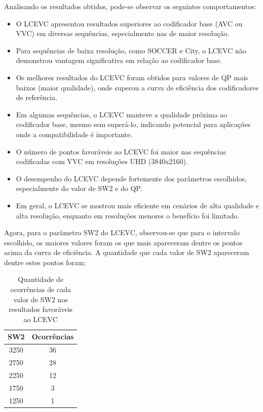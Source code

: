 Analisando os resultados obtidos, pode-se observar os seguintes comportamentos:

\begin{itemize}
    \item O LCEVC apresentou resultados superiores ao codificador base (AVC ou VVC) em diversas sequências, especialmente nas de maior resolução.
    \item Para sequências de baixa resolução, como SOCCER e City, o LCEVC não demonstrou vantagem significativa em relação ao codificador base.
    \item Os melhores resultados do LCEVC foram obtidos para valores de QP mais baixos (maior qualidade), onde superou a curva de eficiência dos codificadores de referência.
    \item Em algumas sequências, o LCEVC manteve a qualidade próxima ao codificador base, mesmo sem superá-lo, indicando potencial para aplicações onde a compatibilidade é importante.
    \item O número de pontos favoráveis ao LCEVC foi maior nas sequências codificadas com VVC em resoluções UHD (3840x2160).
    \item O desempenho do LCEVC depende fortemente dos parâmetros escolhidos, especialmente do valor de SW2 e do QP.
    \item Em geral, o LCEVC se mostrou mais eficiente em cenários de alta qualidade e alta resolução, enquanto em resoluções menores o benefício foi limitado.
\end{itemize}

Agora, para o parâmetro SW2 do \acrshort{LCEVC}, observou-se que para o intervalo escolhido,
os maiores valores foram os que mais apareceram dentre os pontos acima da curva de eficiência.
A quantidade que cada valor de SW2 apareceram dentre estes pontos foram:

\begin{table}[h]
    \centering
    \begin{tabular}{|c|c|}
        \hline
        \textbf{SW2} & \textbf{Ocorrências} \\
        \hline
        3250 & 36 \\
        2750 & 28 \\
        2250 & 12 \\
        1750 & 3 \\
        1250 & 1 \\
        \hline
    \end{tabular}
    \caption{Quantidade de ocorrências de cada valor de SW2 nos resultados favoráveis ao LCEVC}
    \label{tab:sw2-contagem}
\end{table}

